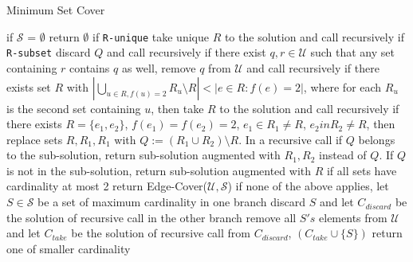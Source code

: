 \begin{algorithm}
\caption{Minimum Set Cover}
\label{alg:rooij}
\begin{algorithmic}[1]
\State if $\mathcal{S}$ = $\emptyset$ return $\emptyset$ 
\State if \texttt{R-unique} take unique $R$ to the solution and call recursively
\State if \texttt{R-subset} discard $Q$ and call recursively
\State if there exist $q, r \in \mathcal{U}$ such that any set containing $r$ contains $q$ as well, remove $q$ from $\mathcal{U}$ and call recursively
\State if there exists set $R$ with $|\bigcup_{u\in R, f(u) = 2} R_u \setminus R| < |e\in R : f(e) = 2|$, where for each $R_u$ is the second set containing $u$, then take $R$ to the solution and call recursively
\State if there exists $R = \{e_1, e_2\}$, $f(e_1) = f(e_2) = 2$, $e_1 \in R_1 \ne R$, $e_2 in R_2 \ne R$, then replace sets $R, R_1, R_1$ with $Q := (R_1 \cup R_2) \setminus R$. In a recursive call if $Q$ belongs to the sub-solution, return sub-solution augmented with $R_1, R_2$ instead of $Q$. If $Q$ is not in the sub-solution, return sub-solution augmented with $R$ 
\State if all sets have cardinality at most 2 return Edge-Cover($\mathcal{U}, \mathcal{S}$)
\State if none of the above applies, let $S \in \mathcal{S}$ be a set of maximum cardinality
\State in one branch discard $S$ and let $C_{discard}$ be the solution of recursive call
\State in the other branch remove all $S's$ elements from $\mathcal{U}$ and let $C_{take}$ be the solution of recursive call
\State from $C_{discard}$, $(C_{take} \cup \{S\})$ return one of smaller cardinality
\EndProcedure
\end{algorithmic}
\end{algorithm}

